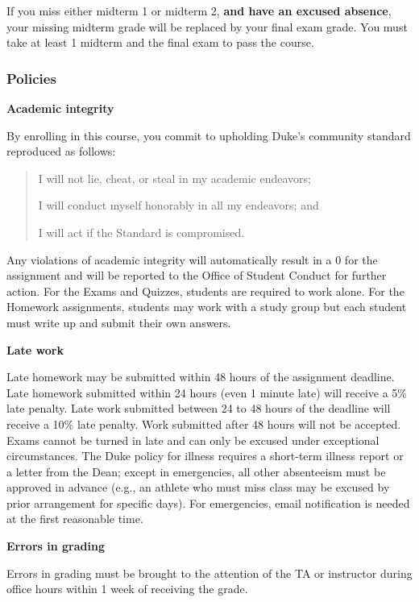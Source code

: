 \documentclass[
  letterpaper,
  DIV=11,
  numbers=noendperiod]{scrartcl}
\begin{document}
\begin{tcolorbox}[enhanced jigsaw, coltitle=black, leftrule=.75mm, bottomtitle=1mm, breakable, colbacktitle=quarto-callout-note-color!10!white, toprule=.15mm, colback=white, arc=.35mm, title=\textcolor{quarto-callout-note-color}{\faInfo}\hspace{0.5em}{A note on exams}, titlerule=0mm, colframe=quarto-callout-note-color-frame, opacityback=0, toptitle=1mm, rightrule=.15mm, bottomrule=.15mm, opacitybacktitle=0.6, left=2mm]

If you miss either midterm 1 or midterm 2, \textbf{and have an excused
absence}, your missing midterm grade will be replaced by your final exam
grade. You must take at least 1 midterm and the final exam to pass the
course.

\end{tcolorbox}

\subsubsection{Policies}\label{policies}

\textbf{Academic integrity}

By enrolling in this course, you commit to upholding Duke's community
standard reproduced as follows:

\begin{quote}
I will not lie, cheat, or steal in my academic endeavors;

I will conduct myself honorably in all my endeavors; and

I will act if the Standard is compromised.
\end{quote}

Any violations of academic integrity will automatically result in a 0
for the assignment and will be reported to the Office of Student Conduct
for further action. For the Exams and Quizzes, students are required to
work alone. For the Homework assignments, students may work with a study
group but each student must write up and submit their own answers.

\newpage

\textbf{Late work}

Late homework may be submitted within 48 hours of the assignment
deadline. Late homework submitted within 24 hours (even 1 minute late)
will receive a 5\% late penalty. Late work submitted between 24 to 48
hours of the deadline will receive a 10\% late penalty. Work submitted
after 48 hours will not be accepted. Exams cannot be turned in late and
can only be excused under exceptional circumstances. The Duke policy for
illness requires a short-term illness report or a letter from the Dean;
except in emergencies, all other absenteeism must be approved in advance
(e.g., an athlete who must miss class may be excused by prior
arrangement for specific days). For emergencies, email notification is
needed at the first reasonable time.

\textbf{Errors in grading}

Errors in grading must be brought to the attention of the TA or
instructor during office hours within 1 week of receiving the grade.
\end{document}
